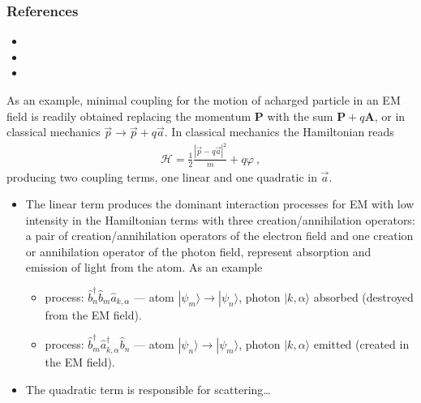 \documentclass[letterpaper,10pt,english]{jupyterBook}
\begin{document}
\subsubsection*{References}

\sphinxAtStartPar
{} 
\begin{itemize}
\item {} 
\sphinxAtStartPar
{}

\item {} 
\sphinxAtStartPar
{}

\item {} 
\sphinxAtStartPar
{}

\end{itemize}

\sphinxAtStartPar
As an example, minimal coupling for the motion of acharged particle in an EM field is readily obtained replacing the momentum \(\mathbf{P}\) with the sum \(\mathbf{P} + q \mathbf{A}\), or in classical mechanics \(\vec{p} \rightarrow \vec{p} + q \vec{a}\). In classical mechanics the Hamiltonian reads
\begin{equation*}
\begin{split}\mathcal{H} = \frac{1}{2}\frac{|\vec{p}- q \vec{a}|^2}{m} + q \varphi \ ,\end{split}
\end{equation*}
\sphinxAtStartPar
producing two coupling terms, one linear and one quadratic in \(\vec{a}\).
\begin{itemize}
\item {} 
\sphinxAtStartPar
The linear term produces the dominant interaction processes \sphinxhyphen{} for EM with low intensity \sphinxhyphen{} in the Hamiltonian terms with three creation/annihilation operators: a pair of creation/annihilation operators of the electron field and one creation or annihilation operator of the photon field, represent absorption and emission of light from the atom. As an example
\begin{itemize}
\item {} 
\sphinxAtStartPar
{} process: \(\hat b_n^\dagger\hat b_m\hat a_{k,\alpha}\) — atom \(|\psi_m\rangle\to|\psi_n\rangle\), photon \(|k,\alpha\rangle\) absorbed (destroyed from the EM field).

\item {} 
\sphinxAtStartPar
{} process: \(\hat b_m^\dagger\hat a^\dagger_{k,\alpha}\hat b_n\) — atom \(|\psi_n\rangle\to|\psi_m\rangle\), photon \(|k,\alpha\rangle\) emitted (created in the EM field).

\end{itemize}

\item {} 
\sphinxAtStartPar
The quadratic term is responsible for scattering…

\end{itemize}
\end{document}
